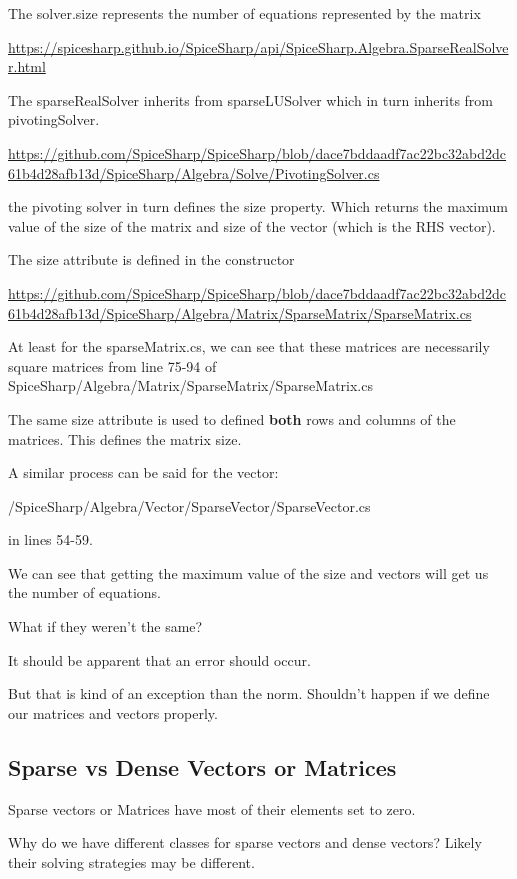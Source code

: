 \documentclass[12pt]{article}
\renewcommand{\_}{\kern-1.5pt\textunderscore\kern-1.5pt}
\begin{document}
The solver.size represents the number of equations represented by the matrix

\url{https://spicesharp.github.io/SpiceSharp/api/SpiceSharp.Algebra.SparseRealSolver.html}

The sparseRealSolver inherits from sparseLUSolver which in turn inherits from pivotingSolver.

\url{https://github.com/SpiceSharp/SpiceSharp/blob/dace7bddaadf7ac22bc32abd2dc61b4d28afb13d/SpiceSharp/Algebra/Solve/PivotingSolver.cs}

the pivoting solver in turn defines the size property. Which returns the maximum value of the size of the matrix and size of the vector (which is the RHS vector).

The size attribute is defined in the constructor

\url{https://github.com/SpiceSharp/SpiceSharp/blob/dace7bddaadf7ac22bc32abd2dc61b4d28afb13d/SpiceSharp/Algebra/Matrix/SparseMatrix/SparseMatrix.cs}

At least for the sparseMatrix.cs, we can see that these matrices are necessarily square matrices from line 75-94 of SpiceSharp/Algebra/Matrix/SparseMatrix/SparseMatrix.cs

The same size attribute is used to defined \textbf{both} rows and columns of the matrices. This defines the matrix size.

A similar process can be said for the vector:

/SpiceSharp/Algebra/Vector/SparseVector/SparseVector.cs

in lines 54-59.

We can see that getting the maximum value of the size and vectors will get us the number of equations.

What if they weren't the same?

It should be apparent that an error should occur.

But that is kind of an exception than the norm. Shouldn't happen if we define our matrices and vectors properly.

\subsection{Sparse vs Dense Vectors or Matrices}

Sparse vectors or Matrices have most of their elements set to zero.

Why do we have different classes for sparse vectors and dense vectors? Likely their solving strategies may be different.
\end{document}
